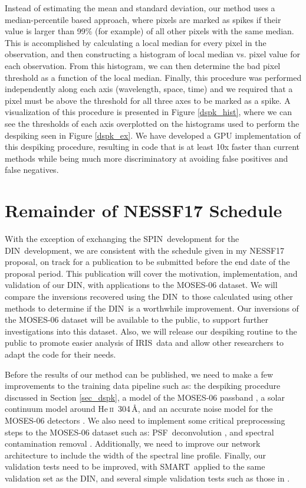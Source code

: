 \documentclass[10pt,letterpaper]{article}
\newcommand{\HeII}{He\,\textsc{ii}~304\,\AA}
\newcommand{\MOSES}{\ac{MOSES}}
\newcommand{\SMART}{\ac{SMART}}
\newcommand{\DIN}{\ac{DIN}}
\newcommand{\SPIN}{\ac{SPIN}}
\newcommand{\IRIS}{\ac{IRIS}}
\newcommand{\PSF}{\ac{PSF}}
\begin{document}
			Instead of estimating the mean and standard deviation, our method uses a median-percentile based approach, where pixels are marked as spikes if their value is larger than 99\% (for example) of all other pixels with the same median. 
			This is accomplished by calculating a local median for every pixel in the observation, and then constructing a histogram of local median vs. pixel value for each observation.
			From this histogram, we can then determine the bad pixel threshold as a function of the local median.
			Finally, this procedure was performed independently along each axis (wavelength, space, time) and we required that a pixel must be above the threshold for all three axes to be marked as a spike.
			A visualization of this procedure is presented in Figure \ref{dspk_hist}, where we can see the thresholds of each axis overplotted on the histograms used to perform the despiking seen in Figure \ref{dspk_ex}.		
			We have developed a GPU implementation of this despiking procedure, resulting in code that is at least 10x faster than current methods while being much more discriminatory at avoiding false positives and false negatives.

		
	\section{Remainder of NESSF17 Schedule}
	
		With the exception of exchanging the \SPIN\ development for the \DIN\ development, we are consistent with the schedule given in my NESSF17 proposal, on track for a publication to be submitted before the end date of the proposal period.
		This publication will cover the motivation, implementation, and validation of our \DIN, with applications to the \MOSES-06 dataset.
		We will compare the inversions recovered using the \DIN\ to those calculated using other methods to determine if the \DIN\ is a worthwhile improvement.
		Our inversions of the \MOSES-06 dataset will be available to the public, to support further investigations into this dataset.
		Also, we will release our despiking routine to the public to promote easier analysis of \IRIS\ data and allow other researchers to adapt the code for their needs.
		
		Before the results of our method can be published, we need to make a few improvements to the training data pipeline such as: the despiking procedure discussed in Section \ref{sec_dspk}, a model of the \MOSES-06 passband \citep{Fox2011}, a solar continuum model around \HeII \citep{Fox2011}, and an accurate noise model for the \MOSES-06 detectors \cite{Rust2017}.
		We also need to implement some critical preprocessing steps to the \MOSES-06 dataset such as: \PSF\ deconvolution \citep{Rust2017}, and spectral contamination removal \citep{Parker2016}.
		Additionally, we need to improve our network architecture to include the width of the spectral line profile.
		Finally, our validation tests need to be improved, with \SMART\ applied to the same validation set as the \DIN, and several simple validation tests such as those in \cite{Rust2017}.
	
\end{document}
